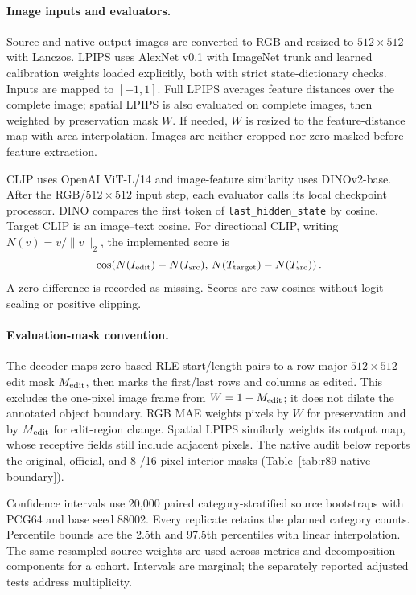 \documentclass[10pt,doubleanonymous]{ieeeconf}
\begin{document}
\paragraph{Image inputs and evaluators.}
Source and native output images are converted to RGB and resized to $512\times512$ with Lanczos. LPIPS uses AlexNet v0.1 with ImageNet trunk and learned calibration weights loaded explicitly, both with strict state-dictionary checks. Inputs are mapped to $[-1,1]$. Full LPIPS averages feature distances over the complete image; spatial LPIPS is also evaluated on complete images, then weighted by preservation mask $W$. If needed, $W$ is resized to the feature-distance map with area interpolation. Images are neither cropped nor zero-masked before feature extraction.

CLIP uses OpenAI ViT-L/14 and image-feature similarity uses DINOv2-base. After the RGB/$512\times512$ input step, each evaluator calls its local checkpoint processor. DINO compares the first token of \texttt{last\_hidden\_state} by cosine. Target CLIP is an image--text cosine. For directional CLIP, writing $N(v)=v/\|v\|_2$, the implemented score is
\begin{equation}
\cos\!\left(N(I_{\rm edit})-N(I_{\rm src}),\,
N(T_{\rm target})-N(T_{\rm src})\right).
\end{equation}
A zero difference is recorded as missing. Scores are raw cosines without logit scaling or positive clipping. 

\paragraph{Evaluation-mask convention.}
The decoder maps zero-based RLE start/length pairs to a row-major $512\times512$ edit mask $M_{\rm edit}$, then marks the first/last rows and columns as edited. This excludes the one-pixel image frame from $W=1-M_{\rm edit}$; it does not dilate the annotated object boundary. RGB MAE weights pixels by $W$ for preservation and by $M_{\rm edit}$ for edit-region change. Spatial LPIPS similarly weights its output map, whose receptive fields still include adjacent pixels. The native audit below reports the original, official, and 8-/16-pixel interior masks (Table~\ref{tab:r89-native-boundary}).

Confidence intervals use 20,000 paired category-stratified source bootstraps with PCG64 and base seed 88002. Every replicate retains the planned category counts. Percentile bounds are the 2.5th and 97.5th percentiles with linear interpolation. The same resampled source weights are used across metrics and decomposition components for a cohort. Intervals are marginal; the separately reported adjusted tests address multiplicity.
\end{document}
